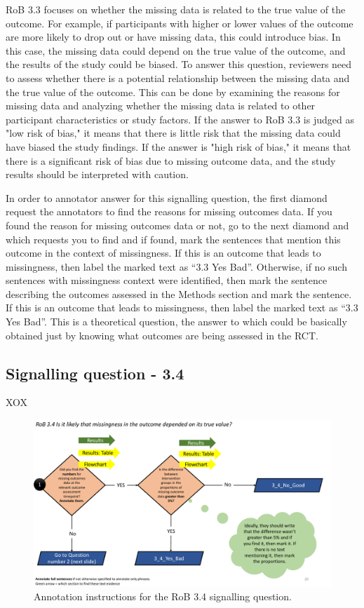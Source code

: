 \documentclass[sn-mathphys,Numbered]{sn-jnl}%
\begin{document}
RoB 3.3 focuses on whether the missing data is related to the true value of the outcome.
For example, if participants with higher or lower values of the outcome are more likely to drop out or have missing data, this could introduce bias.
In this case, the missing data could depend on the true value of the outcome, and the results of the study could be biased.
To answer this question, reviewers need to assess whether there is a potential relationship between the missing data and the true value of the outcome.
This can be done by examining the reasons for missing data and analyzing whether the missing data is related to other participant characteristics or study factors.
If the answer to RoB 3.3 is judged as "low risk of bias," it means that there is little risk that the missing data could have biased the study findings.
If the answer is "high risk of bias," it means that there is a significant risk of bias due to missing outcome data, and the study results should be interpreted with caution.

In order to annotator answer for this signalling question, the first diamond request the annotators to find the reasons for missing outcomes data.
If you found the reason for missing outcomes data or not, go to the next diamond and which requests you to find and if found, mark the sentences that mention this outcome in the context of missingness.
If this is an outcome that leads to missingness, then label the marked text as ``3.3 Yes Bad''.
Otherwise, if no such sentences with missingness context were identified, then mark the sentence describing the outcomes assessed in the Methods section and mark the sentence.
If this is an outcome that leads to missingness, then label the marked text as ``3.3 Yes Bad''.
This is a theoretical question, the answer to which could be basically obtained just by knowing what outcomes are being assessed in the RCT.
%
%
%
\subsection*{Signalling question - 3.4 }
%
XOX

\begin{figure}[hbt]
    \centering
    \includegraphics[width=\textwidth]{figures/3_4_1.pdf}
    \caption{Annotation instructions for the RoB 3.4 signalling question.}
    \label{fig:3_4_1}
\end{figure}
\end{document}
